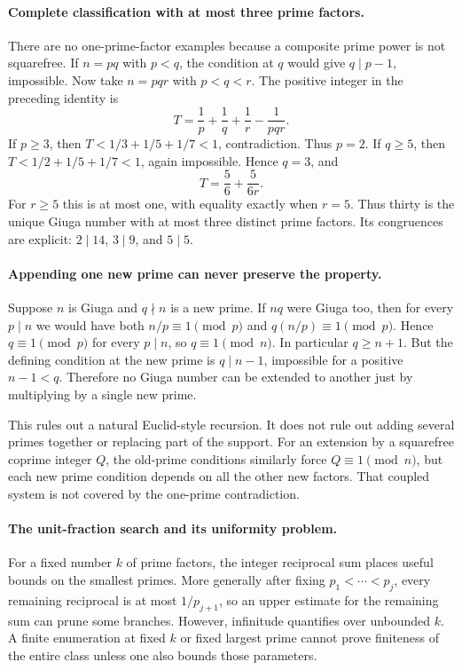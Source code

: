 \documentclass[11pt,a4paper]{article}
\begin{document}
\paragraph{Complete classification with at most three prime factors.}
There are no one-prime-factor examples because a composite prime power
is not squarefree. If $n=pq$ with $p<q$, the condition at $q$ would
give $q\mid p-1$, impossible. Now take $n=pqr$ with $p<q<r$.
The positive integer in the preceding identity is
\[
                  T=\frac1p+\frac1q+\frac1r-\frac1{pqr}.
\]
If $p\ge3$, then $T<1/3+1/5+1/7<1$, contradiction. Thus $p=2$.
If $q\ge5$, then $T<1/2+1/5+1/7<1$, again impossible. Hence
$q=3$, and
\[
                         T=\frac56+\frac5{6r}.
\]
For $r\ge5$ this is at most one, with equality exactly when $r=5$.
Thus thirty is the unique Giuga number with at most three distinct
prime factors. Its congruences are explicit:
$2\mid14$, $3\mid9$, and $5\mid5$.

\paragraph{Appending one new prime can never preserve the property.}
Suppose $n$ is Giuga and $q\nmid n$ is a new prime. If $nq$ were
Giuga too, then for every $p\mid n$ we would have both
$n/p\equiv1\pmod p$ and $q(n/p)\equiv1\pmod p$. Hence
$q\equiv1\pmod p$ for every $p\mid n$, so $q\equiv1\pmod n$.
In particular $q\ge n+1$. But the defining condition at the new
prime is $q\mid n-1$, impossible for a positive $n-1<q$.
Therefore no Giuga number can be extended to another just by
multiplying by a single new prime.

This rules out a natural Euclid-style recursion. It does not rule out
adding several primes together or replacing part of the support.
For an extension by a squarefree coprime integer $Q$, the old-prime
conditions similarly force $Q\equiv1\pmod n$, but each new prime
condition depends on all the other new factors. That coupled system
is not covered by the one-prime contradiction.

\paragraph{The unit-fraction search and its uniformity problem.}
For a fixed number $k$ of prime factors, the integer reciprocal sum
places useful bounds on the smallest primes. More generally after
fixing $p_1<\cdots<p_j$, every remaining reciprocal is at most
$1/p_{j+1}$, so an upper estimate for the remaining sum can prune
some branches. However, infinitude quantifies over unbounded $k$.
A finite enumeration at fixed $k$ or fixed largest prime cannot prove
finiteness of the entire class unless one also bounds those parameters.
\end{document}
